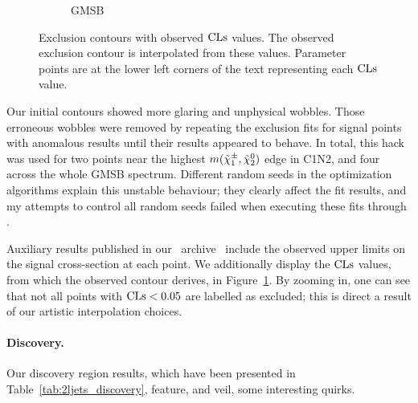 \begin{figure}[tp]
\begin{subfigure}{0.48\textwidth}
\caption{GMSB}
\end{subfigure}
\caption[
Exclusion contours with observed $\cls$ values
]{%
Exclusion contours with observed $\cls$ values.
The observed exclusion contour is interpolated from these values.
Parameter points are at the lower left corners of the text representing each
$\cls$ value.
}
\label{fig:2ljets_fit_contours_cls}
\end{figure}

Our initial contours showed more glaring and unphysical wobbles.
Those erroneous wobbles were removed by repeating the exclusion fits for signal
points with anomalous results until their results appeared to behave.
In total, this hack was used for two points near the highest
$m(\tilde\chi^\pm_1,\tilde\chi^0_2)$ edge in C1N2, and four across the whole
GMSB spectrum.
Different random seeds in the optimization algorithms explain this unstable
behaviour; they clearly affect the fit results, and my attempts to control all
random seeds failed when executing these fits through \histfitter.

Auxiliary results published in our \hepdata\ archive~\cite{hepdata.116034}
include the observed upper limits on the signal cross-section at each point.
We additionally display the $\cls$ values, from which the observed contour
derives, in Figure~\ref{fig:2ljets_fit_contours_cls}.
By zooming in, one can see that not all points with $\mathrm{CLs} < 0.05$ are
labelled as excluded;
this is direct a result of our artistic interpolation choices.


\paragraph{Discovery.}
Our discovery region results,
which have been presented in Table~\ref{tab:2ljets_discovery},
feature, and veil, some interesting quirks.

